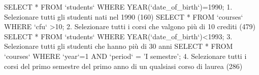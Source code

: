 SELECT * FROM `students` WHERE YEAR(`date_of_birth`)=1990; 1. Selezionare tutti gli studenti nati nel 1990 (160)
SELECT * FROM `courses` WHERE `cfu` >10;  2. Selezionare tutti i corsi che valgono più di 10 crediti (479)
SELECT * FROM `students` WHERE YEAR(`date_of_birth`)<1993; 3. Selezionare tutti gli studenti che hanno più di 30 anni 
SELECT * FROM `courses` WHERE `year`=1 AND `period` = 'I semestre'; 4. Selezionare tutti i corsi del primo semestre del primo anno di un qualsiasi corso di
laurea (286)
